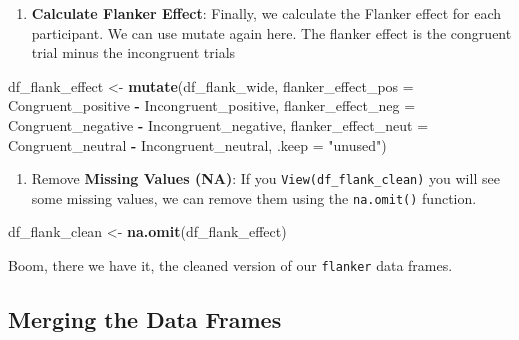 \documentclass[
]{book}
\newenvironment{Shaded}{\begin{snugshade}}{\end{snugshade}}
\newcommand{\AttributeTok}[1]{\textcolor[rgb]{0.13,0.29,0.53}{#1}}
\newcommand{\FunctionTok}[1]{\textcolor[rgb]{0.13,0.29,0.53}{\textbf{#1}}}
\newcommand{\NormalTok}[1]{#1}
\newcommand{\OtherTok}[1]{\textcolor[rgb]{0.56,0.35,0.01}{#1}}
\newcommand{\SpecialCharTok}[1]{\textcolor[rgb]{0.81,0.36,0.00}{\textbf{#1}}}
\newcommand{\StringTok}[1]{\textcolor[rgb]{0.31,0.60,0.02}{#1}}
\providecommand{\tightlist}{%
  \setlength{\itemsep}{0pt}\setlength{\parskip}{0pt}}
\begin{document}
\begin{enumerate}
\def\labelenumi{\arabic{enumi}.}
\setcounter{enumi}{6}
\tightlist
\item
  \textbf{Calculate Flanker Effect}: Finally, we calculate the Flanker effect for each participant. We can use mutate again here. The flanker effect is the congruent trial minus the incongruent trials
\end{enumerate}

\begin{Shaded}
\begin{Highlighting}[]
\NormalTok{df\_flank\_effect }\OtherTok{\textless{}{-}} \FunctionTok{mutate}\NormalTok{(df\_flank\_wide,}
                         \AttributeTok{flanker\_effect\_pos =}\NormalTok{ Congruent\_positive }\SpecialCharTok{{-}}\NormalTok{ Incongruent\_positive,}
                         \AttributeTok{flanker\_effect\_neg =}\NormalTok{ Congruent\_negative }\SpecialCharTok{{-}}\NormalTok{ Incongruent\_negative,}
                         \AttributeTok{flanker\_effect\_neut =}\NormalTok{ Congruent\_neutral }\SpecialCharTok{{-}}\NormalTok{ Incongruent\_neutral,}
                         \AttributeTok{.keep =} \StringTok{"unused"}\NormalTok{)}
\end{Highlighting}
\end{Shaded}

\begin{enumerate}
\def\labelenumi{\arabic{enumi}.}
\setcounter{enumi}{7}
\tightlist
\item
  Remove \textbf{Missing Values (NA)}: If you \texttt{View(df\_flank\_clean)} you will see some missing values, we can remove them using the \texttt{na.omit()} function.
\end{enumerate}

\begin{Shaded}
\begin{Highlighting}[]
\NormalTok{df\_flank\_clean }\OtherTok{\textless{}{-}} \FunctionTok{na.omit}\NormalTok{(df\_flank\_effect)}
\end{Highlighting}
\end{Shaded}

Boom, there we have it, the cleaned version of our \texttt{flanker} data frames.

\hypertarget{merging-the-data-frames}{%
\subsection{Merging the Data Frames}\label{merging-the-data-frames}}
\end{document}
